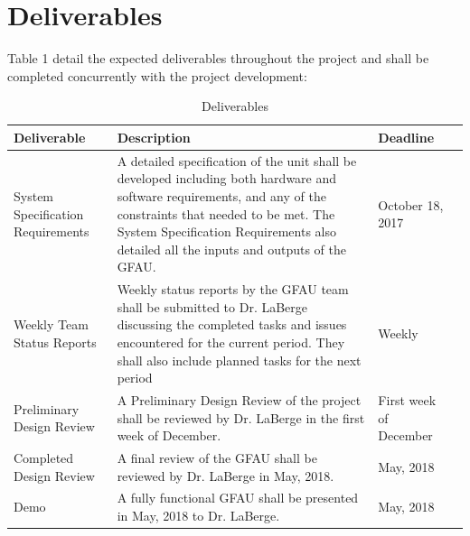 \documentclass[12pt]{extarticle}
\begin{document}
    \newpage
    \section{Deliverables} Table 1 detail the expected deliverables throughout
    the project and shall be completed concurrently with the project
    development:

    \begin{table}[h]

        \renewcommand{\arraystretch}{1.8}
        \caption{Deliverables}
        \centering

        \begin{tabular}{ | p{5cm} | p{7cm} | l | p{5cm} |}

            \hline \textbf{Deliverable} & \textbf{Description} &
            \textbf{Deadline} \\

            \hline System Specification Requirements & A detailed specification
            of the unit shall be developed including both hardware and software
            requirements, and any of the constraints that needed to be met. The
            System Specification Requirements also detailed all the inputs and
            outputs of the GFAU. & October 18, 2017 \\

            \hline Weekly Team Status Reports & Weekly status reports by the
            GFAU team shall be submitted to Dr. LaBerge discussing the
            completed tasks and issues encountered for the current period. They
            shall also include planned tasks for the next period & Weekly \\

            \hline Preliminary Design Review & A Preliminary Design Review of
            the project shall be reviewed by Dr. LaBerge in the first week of
            December. & First week of December \\

            \hline Completed Design Review & A final review of the GFAU shall
            be reviewed by Dr. LaBerge in May, 2018. & May, 2018 \\

            \hline Demo & A fully functional GFAU shall be presented in May,
            2018 to Dr. LaBerge. & May, 2018 \\

            \hline

        \end{tabular}

    \end{table}
\end{document}
